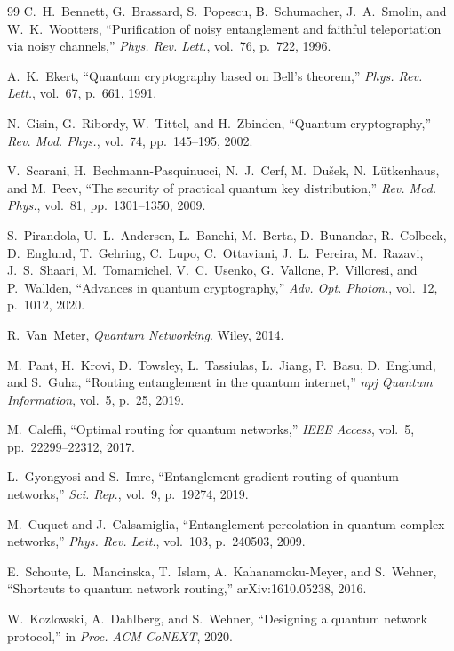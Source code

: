 \documentclass[twocolumn]{article}
\begin{document}
\begin{thebibliography}{99}
C.~H.~Bennett, G.~Brassard, S.~Popescu, B.~Schumacher, J.~A.~Smolin,
and W.~K.~Wootters,
``Purification of noisy entanglement and faithful teleportation via
noisy channels,''
\emph{Phys. Rev. Lett.}, vol.~76, p.~722, 1996.

A.~K.~Ekert, ``Quantum cryptography based on Bell's theorem,''
\emph{Phys. Rev. Lett.}, vol.~67, p.~661, 1991.

N.~Gisin, G.~Ribordy, W.~Tittel, and H.~Zbinden,
``Quantum cryptography,''
\emph{Rev. Mod. Phys.}, vol.~74, pp.~145--195, 2002.

V.~Scarani, H.~Bechmann-Pasquinucci, N.~J.~Cerf, M.~Du\v{s}ek,
N.~L\"utkenhaus, and M.~Peev,
``The security of practical quantum key distribution,''
\emph{Rev. Mod. Phys.}, vol.~81, pp.~1301--1350, 2009.

S.~Pirandola, U.~L.~Andersen, L.~Banchi, M.~Berta, D.~Bunandar,
R.~Colbeck, D.~Englund, T.~Gehring, C.~Lupo, C.~Ottaviani,
J.~L.~Pereira, M.~Razavi, J.~S.~Shaari, M.~Tomamichel,
V.~C.~Usenko, G.~Vallone, P.~Villoresi, and P.~Wallden,
``Advances in quantum cryptography,''
\emph{Adv. Opt. Photon.}, vol.~12, p.~1012, 2020.

R.~Van~Meter, \emph{Quantum Networking}.  Wiley, 2014.

M.~Pant, H.~Krovi, D.~Towsley, L.~Tassiulas, L.~Jiang, P.~Basu,
D.~Englund, and S.~Guha,
``Routing entanglement in the quantum internet,''
\emph{npj Quantum Information}, vol.~5, p.~25, 2019.

M.~Caleffi, ``Optimal routing for quantum networks,''
\emph{IEEE Access}, vol.~5, pp.~22299--22312, 2017.

L.~Gyongyosi and S.~Imre,
``Entanglement-gradient routing of quantum networks,''
\emph{Sci. Rep.}, vol.~9, p.~19274, 2019.

M.~Cuquet and J.~Calsamiglia,
``Entanglement percolation in quantum complex networks,''
\emph{Phys. Rev. Lett.}, vol.~103, p.~240503, 2009.

E.~Schoute, L.~Mancinska, T.~Islam, A.~Kahanamoku-Meyer, and
S.~Wehner, ``Shortcuts to quantum network routing,''
arXiv:1610.05238, 2016.

W.~Kozlowski, A.~Dahlberg, and S.~Wehner,
``Designing a quantum network protocol,''
in \emph{Proc. ACM CoNEXT}, 2020.


\end{thebibliography}
\end{document}
